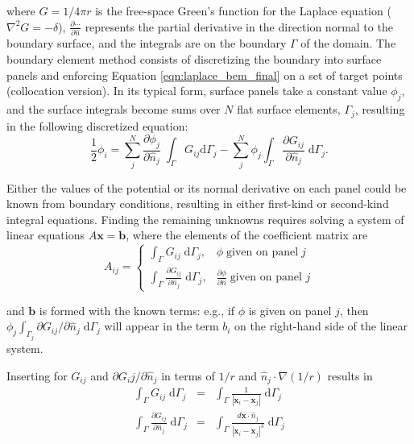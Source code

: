 \documentclass[final,leqno,]{siamltex1213}
\newcommand{\di}[1]{\text{d}#1}
\newcommand{\partiald}[2]{\frac{\partial #1}{\partial #2}}
\newcommand{\partialdi}[2]{\partial #1 / \partial #2}
\newcommand{\nhat}{\hat{n}}
\newcommand{\vect}[1]{\mathbf{#1}}
\begin{document}
\noindent where $G = 1/4\pi r$ is the free-space Green's function for the Laplace equation ($\nabla^{2}G = -\delta$),  $\partiald{\cdots}{\nhat}$ represents the partial derivative in the direction normal to the boundary surface, and the integrals are on the boundary $\Gamma$ of the domain. The boundary element method consists of discretizing the boundary into surface panels and enforcing Equation \eqref{eqn:laplace_bem_final} on a set of target points (collocation version). In its typical form, surface panels take a constant value $\phi_j$, and the surface integrals become sums over $N$ flat surface elements, $\Gamma_j$, resulting in the following discretized equation:
%
\begin{equation}
	\frac{1}{2}\phi_i = \sum_j^{N} \partiald{\phi_j}{\nhat_j}\;\int_{\Gamma}G_{ij}\di{\Gamma_j} - \sum_j^{N} \phi_j\int_{\Gamma}\partiald{G_{ij}}{\nhat_j}\;\di{\Gamma_j}.
\end{equation}

Either the values of the potential or its normal derivative on each panel could be known from boundary conditions, resulting in either first-kind or second-kind integral equations. Finding the remaining unknowns requires solving a system of linear equations $A\vect{x}=\vect{b}$, where the elements of the coefficient matrix are
%
\begin{equation}
	A_{ij} = 
	\begin{cases}
		\int_{\Gamma} G_{ij}\;\di{\Gamma_j}, & \phi\;\text{given on panel}\;j \\
		\int_{\Gamma} \partiald{G_{ij}}{\nhat_j}\;\di{\Gamma_j}, & \partiald{\phi}{\nhat}\;\text{given on panel } j
	\end{cases}
\end{equation}

\noindent
and $\vect{b}$ is formed with the known terms: e.g., if $\phi$ is given on panel $j$, then $\phi_j\int_{\Gamma_j}\partialdi{G_{ij}}{\nhat_j}\;\di{\Gamma_j}$ will appear in the term $b_i$ on the right-hand side of the linear system.

Inserting for $G_{ij}$ and $\partialdi{G_ij}{\nhat_j}$ in terms of $1/r$ and $\nhat_j\cdot\nabla(1/r)$ results in
%
\begin{eqnarray}
	\label{eqn:laplace_bem_G}\int_{\Gamma} G_{ij}\;\di{\Gamma_j} & = & \int_{\Gamma} \frac{1}{|\vect{x}_i-\vect{x}_j|} \;\di{\Gamma_j} \\ 
	\label{eqn:laplace_bem_dGdn}\int_{\Gamma} \partiald{G_{ij}}{\nhat_j}\;\di{\Gamma_j} & = & \int_{\Gamma}\frac{d\vect{x}\cdot\nhat_j}{|\vect{x}_i-\vect{x}_j|^{3}}\;\di{\Gamma_j}
\end{eqnarray}
\end{document}
